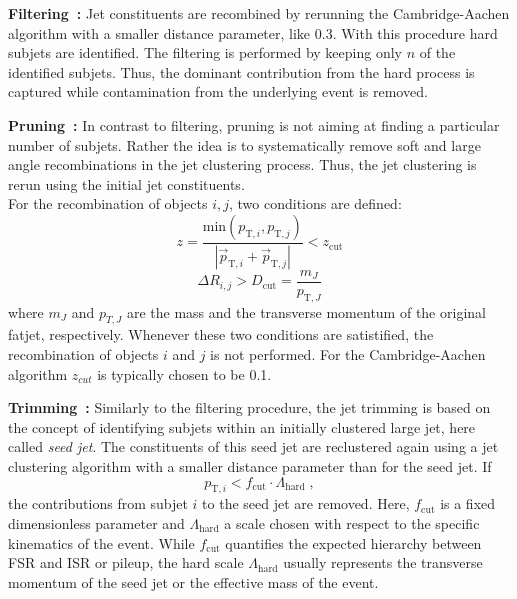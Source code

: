 \begin{description}
 \item \textbf{Filtering~\cite{Butterworth:2008tr}:} Jet constituents are recombined by rerunning the Cambridge-Aachen algorithm with a smaller distance parameter, like 0.3. With this procedure hard subjets are identified. The filtering is performed by keeping only $n$ of the identified subjets. Thus, the dominant contribution from the hard process is captured while contamination from the underlying event is removed.
 \item \textbf{Pruning~\cite{Ellis:2009su}:} In contrast to filtering, pruning is not aiming at finding a particular number of subjets. Rather the idea is to systematically remove soft and large angle recombinations in the jet clustering process. Thus, the jet clustering is rerun using the initial jet constituents. \\
For the recombination of objects $i, j$, two conditions are defined:
\begin{equation*}
z = \frac{\mathrm{min}(p_{\mathrm{T},i}, p_{\mathrm{T},j})}{|\vec{p}_{\mathrm{T},i} + \vec{p}_{\mathrm{T},j}|} < z_\mathrm{cut}
\end{equation*}
\begin{equation*}
\Delta R_{i,j} > D_\mathrm{cut} = \frac{m_{J}}{p_{\mathrm{T}, J}}
\end{equation*}
where $m_{J}$ and $p_{T, J}$ are the mass and the transverse momentum of the original fatjet, respectively. Whenever these two conditions are satistified, the recombination of objects $i$ and $j$ is not performed. For the Cambridge-Aachen algorithm $z_{cut}$ is typically chosen to be 0.1.
 \item \textbf{Trimming~\cite{Krohn:2009th}:} Similarly to the filtering procedure, the jet trimming is based on the concept of identifying subjets within an initially clustered large jet, here called \textit{seed jet}. The constituents of this seed jet are reclustered again using a jet clustering algorithm with a smaller distance parameter than for the seed jet. If 
\begin{equation*}
p_{\mathrm{T},i} < f_{\mathrm{cut}} \cdot \Lambda_{\mathrm{hard}} \; ,
\end{equation*}
the contributions from subjet $i$ to the seed jet are removed. Here, $f_{\mathrm{cut}}$ is a fixed dimensionless parameter and $\Lambda_{\mathrm{hard}}$ a scale chosen with respect to the specific kinematics of the event. While $f_{\mathrm{cut}}$ quantifies the expected hierarchy between FSR and ISR or pileup, the hard scale $\Lambda_{\mathrm{hard}}$ usually represents the transverse momentum of the seed jet or the effective mass of the event.%
\end{description} 
